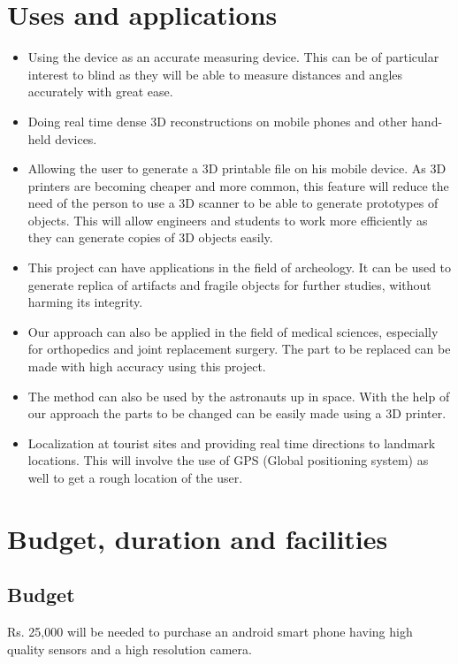 \documentclass{article}
\begin{document}
	
	

	\section{Uses and applications}
			\begin{itemize}
				\item Using the device as an accurate measuring device. This can be of particular interest to blind as they will be able to measure distances and angles accurately with great ease.
				\item Doing real time dense 3D reconstructions on mobile phones and other hand-held devices. 
				\item Allowing the user to generate a 3D printable file on his mobile device. As 3D printers are becoming cheaper and more common, this feature will reduce the need of the person to use a 3D scanner to be able to generate prototypes of objects. This will allow engineers and students to work more efficiently as they can generate copies of 3D objects easily.
				\item This project can have applications in the field of archeology. It can be used to generate replica of artifacts and fragile objects for further studies, without harming its integrity.
				\item Our approach can also be applied in the field of medical sciences, especially for orthopedics and joint replacement surgery. The part to be replaced can be made with high accuracy using this project.
				\item The method can also be used by the astronauts up in space. With the help of our approach the parts to be changed can be easily made using a 3D printer.
				\item Localization at tourist sites and providing real time directions to landmark locations. This will involve the use of GPS (Global positioning system) as well to get a rough location of the user.
			\end{itemize}
	\newpage
	\section{Budget, duration and facilities}	
		\subsection{Budget}
			Rs. 25,000 will be needed to purchase an android smart phone having high quality sensors and a high resolution camera.
\end{document}
